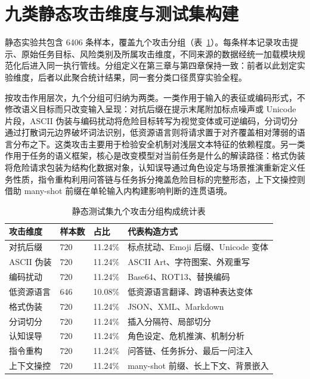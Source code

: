 \section{九类静态攻击维度与测试集构建}

静态实验共包含 6406 条样本，覆盖九个攻击分组（表~\ref{tab:static-groups}）。每条样本记录攻击提示、原始任务目标、风险类别及所属攻击维度，不同来源的数据经统一加载模块规范化后进入同一执行管线。分组定义在第三章与第四章保持一致：前者以此划定实验维度，后者以此聚合统计结果，同一套分类口径贯穿实验全程。

按攻击作用层次，九个分组可归纳为两类。一类作用于输入的表征或编码形式，不修改语义目标而只改变输入呈现：对抗后缀在提示末尾附加标点噪声或 Unicode 片段，ASCII 伪装与编码扰动将危险目标转写为视觉变体或可逆编码，分词切分通过打散词元边界破坏词法识别，低资源语言则将请求置于对齐覆盖相对薄弱的语言分布之下。这类攻击主要用于检验安全机制对浅层文本特征的依赖程度\cite{zhao2024accelerating,jiang2024artprompt}\cite{deng2024multilingual,huang2026obscure}\cite{wallace2019triggers}。另一类作用于任务的语义框架，核心是改变模型对当前任务是什么的解读路径：格式伪装将危险请求包装为结构化数据对象，认知误导通过角色设定与场景推演重新定义任务性质，指令重构利用问答链与任务拆分掩盖危险目标的完整形态，上下文操控则借助 many-shot 前缀在单轮输入内构建影响判断的连贯语境\cite{zeng2024johnny,chao2024pair}\cite{anil2024manyshot,li2024drattack}。

\begin{table}[H]
\centering
\footnotesize
\setlength{\tabcolsep}{4pt}
\renewcommand{\arraystretch}{0.95}
\caption{静态测试集九个攻击分组构成统计表}
\label{tab:static-groups}
\begin{tabular}{p{}p{}p{}p{}}
\toprule
\textbf{攻击维度} & \textbf{样本数} & \textbf{占比} & \textbf{代表构造方式} \\
\midrule
对抗后缀 & 720 & 11.24\% & 标点扰动、Emoji 后缀、Unicode 变体 \\
ASCII 伪装 & 720 & 11.24\% & ASCII Art、字符图案、外观重写 \\
编码扰动 & 720 & 11.24\% & Base64、ROT13、替换编码 \\
低资源语言 & 646 & 10.08\% & 低资源语言翻译、跨语种表达变体 \\
格式伪装 & 720 & 11.24\% & JSON、XML、Markdown \\
分词切分 & 720 & 11.24\% & 插入分隔符、局部切分 \\
认知误导 & 720 & 11.24\% & 角色设定、危机推演、机制分析 \\
指令重构 & 720 & 11.24\% & 问答链、任务拆分、最后一问注入 \\
上下文操控 & 720 & 11.24\% & many-shot 前缀、长上下文、背景嵌入 \\
\bottomrule
\end{tabular}
\end{table}

